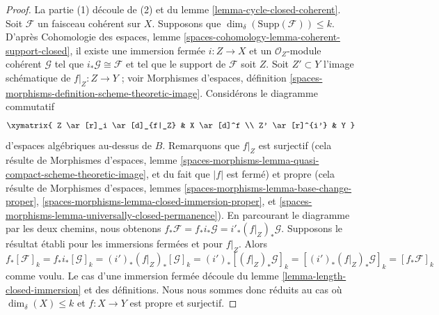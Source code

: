 \begin{proof}
La partie (1) découle de (2) et du lemme \ref{lemma-cycle-closed-coherent}.
Soit $\mathcal{F}$ un faisceau cohérent sur $X$. Supposons que
$\dim_\delta(\text{Supp}(\mathcal{F})) \leq k$. D'après Cohomologie des espaces,
lemme \ref{spaces-cohomology-lemma-coherent-support-closed}, il existe une
immersion fermée $i : Z \to X$ et un $\mathcal{O}_Z$-module cohérent
$\mathcal{G}$ tel que $i_*\mathcal{G} \cong \mathcal{F}$ et tel que le support
de $\mathcal{F}$ soit $Z$. Soit $Z' \subset Y$ l'image schématique de
$f|_Z : Z \to Y$ ; voir Morphismes d'espaces, définition
\ref{spaces-morphisms-definition-scheme-theoretic-image}. Considérons le
diagramme commutatif
$$
\xymatrix{
Z \ar[r]_i \ar[d]_{f|_Z} &
X \ar[d]^f \\
Z' \ar[r]^{i'} & Y
}
$$
d'espaces algébriques au-dessus de $B$. Remarquons que $f|_Z$ est surjectif
(cela résulte de Morphismes d'espaces, lemme
\ref{spaces-morphisms-lemma-quasi-compact-scheme-theoretic-image}, et du fait
que $|f|$ est fermé) et propre (cela résulte de Morphismes d'espaces, lemmes
\ref{spaces-morphisms-lemma-base-change-proper},
\ref{spaces-morphisms-lemma-closed-immersion-proper}, et
\ref{spaces-morphisms-lemma-universally-closed-permanence}). En parcourant le
diagramme par les deux chemins, nous obtenons $f_*\mathcal{F} =
f_*i_*\mathcal{G} = i'_*(f|_Z)_*\mathcal{G}$. Supposons le résultat établi pour
les immersions fermées et pour $f|_Z$. Alors
$$
f_*[\mathcal{F}]_k = f_*i_*[\mathcal{G}]_k
= (i')_*(f|_Z)_*[\mathcal{G}]_k =
(i')_*[(f|_Z)_*\mathcal{G}]_k =
[(i')_*(f|_Z)_*\mathcal{G}]_k = [f_*\mathcal{F}]_k
$$
comme voulu. Le cas d'une immersion fermée découle du lemme
\ref{lemma-length-closed-immersion} et des définitions. Nous nous sommes donc
réduits au cas où $\dim_\delta(X) \leq k$ et $f : X \to Y$ est propre et
surjectif.


\end{proof}
